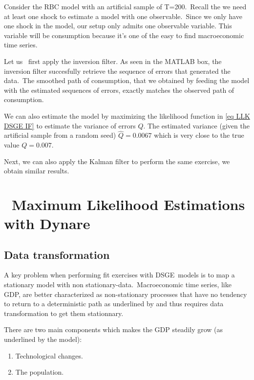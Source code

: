 \documentclass[a4paper,12pt]{article}%
\begin{document}
Consider the RBC model with an artificial sample of T=200.\ Recall the we need
at least one shock to estimate a model with one observable.\ Since we only
have one shock in the model, our setup only admits one observable variable.
This variable will be consumption because it's one of the easy to find
macroeconomic time series.%

%


Let us \ first apply the inversion filter. As seen in the MATLAB box, the
inversion filter succesfully retrieve the sequence of errors that generated
the data.\ The smoothed path of consumption, that we obtained by feeding the
model with the estimated sequences of errors, exactly matches the observed
path of consumption.

We can also estimate the model by maximizing the likelihood function in
\autoref{eq LLK DSGE IF} to estimate the variance of errors $Q$. The estimated
variance (given the artificial sample from a random seed) $\hat{Q}=0.0067$
which is very close to the true value $Q=0.007$.

Next, we can also apply the Kalman filter to perform the same exercise, we
obtain similar results.

\newpage

\section{\ Maximum Likelihood Estimations with Dynare}

\subsection{Data transformation}

A key problem when performing fit exercises with DSGE\ models is to map a
stationary model with non stationary-data.\ Macroeconomic time series, like
GDP, are better characterized as non-stationary processes that have no
tendency to return to a deterministic path as underlined by
\cite{nelson1982trends} and thus requires data transformation to get them stationnary.

There are two main components which makes the GDP steadily grow (as underlined
by the \cite{solow1956contribution} model):

\begin{enumerate}
\item Technological changes.

\item The population.
\end{enumerate}
\end{document}

